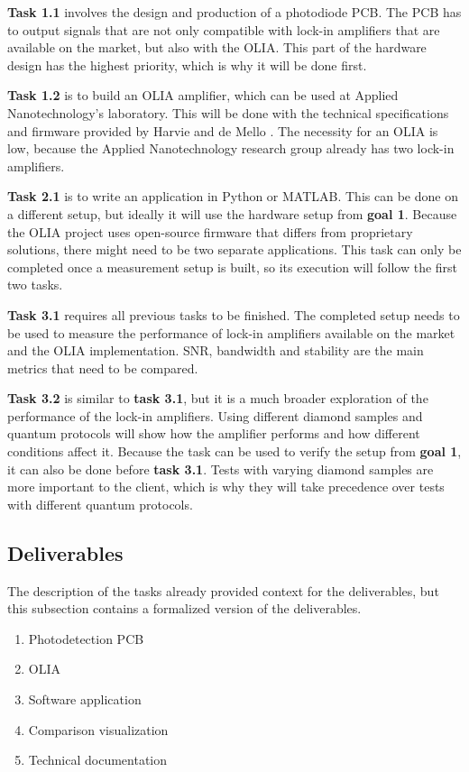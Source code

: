 \documentclass{report}
\begin{document}
	\textbf{Task 1.1} involves the design and production of a photodiode PCB. The PCB has to output signals that are not only compatible with lock-in amplifiers that are available on the market, but also with the OLIA. This part of the hardware design has the highest priority, which is why it will be done first. 
	
	\textbf{Task 1.2} is to build an OLIA amplifier, which can be used at Applied Nanotechnology's laboratory. This will be done with the technical specifications and firmware provided by Harvie and de Mello \cite{harvie2023olia}. The necessity for an OLIA is low, because the Applied Nanotechnology research group already has two lock-in amplifiers.
	
	\textbf{Task 2.1} is to write an application in Python or MATLAB. This can be done on a different setup, but ideally it will use the hardware setup from \textbf{goal 1}. Because the OLIA project uses open-source firmware that differs from proprietary solutions, there might need to be two separate applications. This task can only be completed once a measurement setup is built, so its execution will follow the first two tasks.
	
	
	\textbf{Task 3.1} requires all previous tasks to be finished. The completed setup needs to be used to measure the performance of lock-in amplifiers available on the market and the OLIA implementation. SNR, bandwidth and stability are the main metrics that need to be compared.
	
	\textbf{Task 3.2} is similar to \textbf{task 3.1}, but it is a much broader exploration of the performance of the lock-in amplifiers. Using different diamond samples and quantum protocols will show how the amplifier performs and how different conditions affect it. Because the task can be used to verify the setup from \textbf{goal 1}, it can also be done before \textbf{task 3.1}. Tests with varying diamond samples are more important to the client, which is why they will take precedence over tests with different quantum protocols.
	
	
	\subsection{Deliverables}
	The description of the tasks already provided context for the deliverables, but this subsection contains a formalized version of the deliverables.
	
	\begin{enumerate}
		\item Photodetection PCB 
		\item OLIA
		\item Software application
		\item Comparison visualization
		\item Technical documentation
	\end{enumerate}
	
\end{document}
